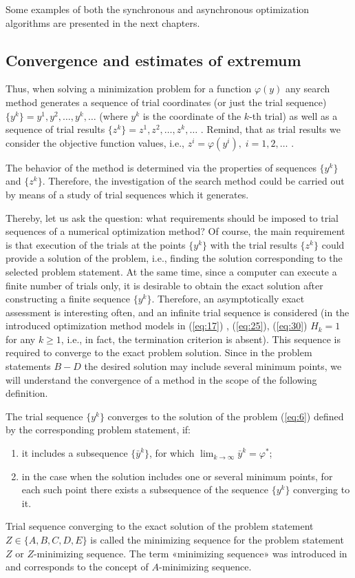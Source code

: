 Some examples of both the synchronous and asynchronous optimization algorithms are presented in the next chapters.
\subsection {Convergence and estimates of extremum}
\label {subsec:1.2.3}
Thus, when solving a minimization problem for a function  $\varphi(y)$ any search method generates a sequence of trial coordinates (or just the trial sequence) $\{y^k\}=y^1,y^2,\ldots,y^k,\ldots$  (where $y^k$   is the coordinate of the $k$-th trial) as well as a sequence of trial results $\{z^k\}=z^1,z^2,\ldots,z^k,\ldots$ . Remind, that as trial results we consider the objective function values, i.e., $z^i=\varphi(y^i),\;i=1,2,\ldots$ .    

The behavior of the method is determined via the properties of sequences  $\{y^k\}$ and  $\{z^k\}$. Therefore, the investigation of the search method could be carried out by means of a study of trial sequences which it generates. 

Thereby, let us ask the question: what requirements should be imposed to trial sequences of a numerical optimization method? Of course, the main requirement is that execution of the trials at the points $\{y^k\}$  with the trial results $\{z^k\}$  could provide a solution of the problem, i.e., finding the solution corresponding to the selected problem statement. At the same time, since a computer can execute a finite number of trials only, it is desirable to obtain the exact solution after constructing a finite sequence $\{y^k\}$. Therefore,  an asymptotically exact assessment is interesting often, and an infinite trial sequence is considered (in the introduced  optimization method models in (\ref{eq:17}) , (\ref{eq:25}), (\ref{eq:30}) $H_k=1$  for any $k\geq1$, i.e., in fact, the termination criterion is absent). This sequence is required to converge to the exact problem solution. Since in the problem statements $B-D$ the desired solution may include several minimum points, we will understand the convergence of a method in the scope of the following definition.
\begin{definition} 
\label{def:1_4}
The trial sequence $\{y^k\}$  converges to the solution of the problem (\ref{eq:6}) defined by the corresponding problem statement, if:
\begin{enumerate}
\item{it includes a subsequence  $\{\bar{y}^k\}$, for which $\lim_{k \to \infty}\bar{y}^k=\varphi^*$;}
\item{in the case when the solution includes one or several minimum points, for each such point there exists a subsequence of the sequence $\{y^k\}$  converging to it.}
\end{enumerate}
\end{definition}
Trial sequence converging to the exact solution of the problem statement $Z \in \{A,B,C,D,E\}$ is called the minimizing sequence for the problem statement $Z$ or $Z$-minimizing sequence. The term «minimizing sequence» was introduced in \cite{1_Vasiliev} and corresponds to the concept of $A$-minimizing sequence.

